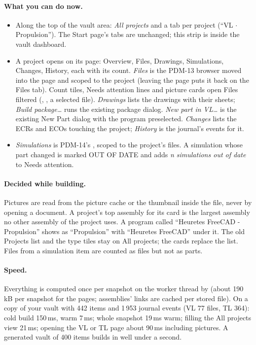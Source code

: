 \paragraph{What you can do now.}
\begin{itemize}[nosep]
  \item Along the top of the vault area: \emph{All projects} and a tab per project (``VL $\cdot$ Propulsion'').
        The Start page's tabs are unchanged; this strip is inside the vault dashboard.
  \item A project opens on its page: Overview, Files, Drawings, Simulations, Changes, History, each with its count.
        \emph{Files} is the PDM-13 browser moved into the page and scoped to the project (leaving the page puts it
        back on the Files tab). Count tiles, Needs attention lines and picture cards open Files filtered
        (, , a selected file). \emph{Drawings} lists the drawings with their sheets;
        \emph{Build package\ldots} runs the existing package dialog. \emph{New part in VL\ldots} is the existing New
        Part dialog with the program preselected. \emph{Changes} lists the ECRs and ECOs touching the project;
        \emph{History} is the journal's events for it.
  \item \emph{Simulations} is PDM-14's , scoped to the project's files. A simulation
        whose part changed is marked OUT OF DATE and adds \emph{n simulations out of date} to Needs attention.
\end{itemize}

\paragraph{Decided while building.} Pictures are read from the picture cache or the thumbnail inside the file, never by
opening a document. A project's top assembly for its card is the largest assembly no other assembly of the project
uses. A program called ``Heuretes FreeCAD - Propulsion'' shows as ``Propulsion'' with ``Heuretes FreeCAD'' under it. The old
Projects list and the type tiles stay on All projects; the cards replace the list. Files from a simulation item are
counted as files but not as parts.

\paragraph{Speed.} Everything is computed once per snapshot on the worker thread by
 (about 190\,kB per snapshot for the pages; assemblies' links are
cached per stored file). On a copy of your vault with 442 items and 1\,953 journal events (VL 77 files, TL 364): cold
build 150\,ms, warm 7\,ms; whole snapshot 19\,ms warm; filling the All projects view 21\,ms; opening the VL or TL page
about 90\,ms including pictures. A generated vault of 400 items builds in well under a second.

